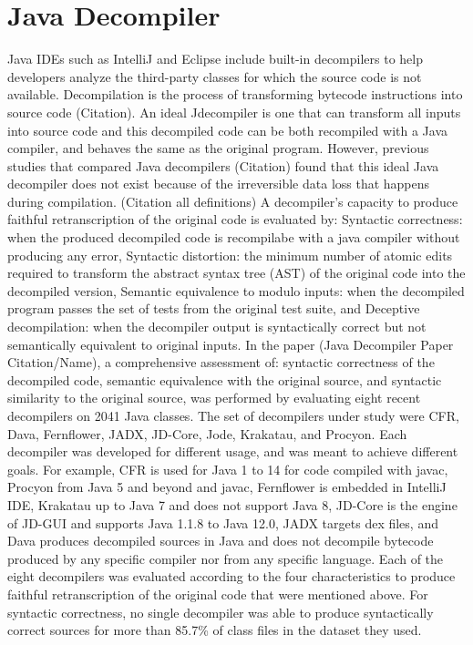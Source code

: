 \documentclass{article}
\begin{document}
\section{Java Decompiler}
Java IDEs such as IntelliJ and Eclipse include built-in decompilers to help developers analyze the third-party classes for which the source code is not available.
Decompilation is the process of transforming bytecode instructions into source code (Citation).
An ideal Jdecompiler is one that can transform all inputs into source code and this decompiled code can be both recompiled with a Java compiler, and behaves the same as the original program.
However, previous studies that compared Java decompilers (Citation) found that this ideal Java decompiler does not exist because of the irreversible data loss that happens during compilation.
(Citation all definitions) A decompiler’s capacity to produce faithful retranscription of the original code is evaluated by: Syntactic correctness: when the produced decompiled code is recompilabe with a java compiler without producing any error, Syntactic distortion: the minimum number of atomic edits required to transform the abstract syntax tree (AST) of the original code into the decompiled version, Semantic equivalence to modulo inputs: when the decompiled program passes the set of tests from the original test suite, and Deceptive decompilation: when the decompiler output is syntactically correct but not semantically equivalent to original inputs.
In the paper (Java Decompiler Paper Citation/Name), a comprehensive assessment of: syntactic correctness of the decompiled code, semantic equivalence with the original source, and syntactic similarity to the original source, was performed by evaluating eight recent decompilers on 2041 Java classes.
The set of decompilers under study were CFR, Dava, Fernflower, JADX, JD-Core, Jode, Krakatau, and Procyon.
Each decompiler was developed for different usage, and was meant to achieve different goals.
For example, CFR is used for Java 1 to 14 for code compiled with javac, Procyon from Java 5 and beyond and javac, Fernflower is embedded in IntelliJ IDE, Krakatau up to Java 7 and does not support Java 8, JD-Core is the engine of JD-GUI and supports Java 1.1.8 to Java 12.0, JADX targets dex files, and Dava produces decompiled sources in Java and does not decompile bytecode produced by any specific compiler nor from any specific language.
Each of the eight decompilers was evaluated according to the four characteristics to produce faithful retranscription of the original code that were mentioned above.
For syntactic correctness, no single decompiler was able to produce syntactically correct sources for more than 85.7\% of class files in the dataset they used.
\end{document}
